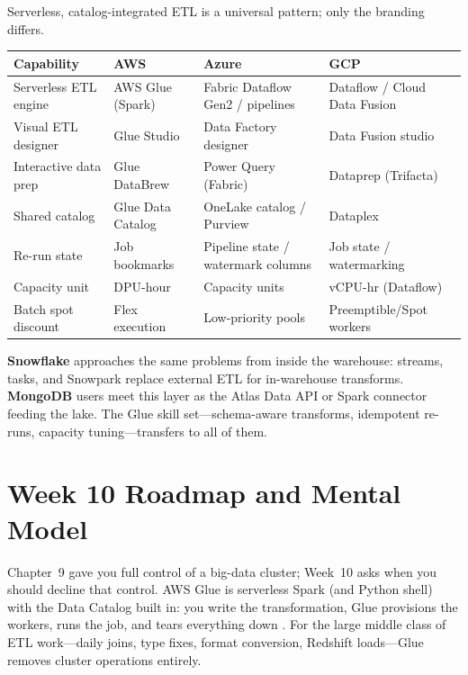 \begin{crosscloud}
Serverless, catalog-integrated ETL is a universal pattern; only the branding differs.

\vspace{2mm}
{\footnotesize
\begin{tabular}{@{}p{2.8cm}p{3.0cm}p{3.0cm}p{3.0cm}@{}}
\toprule
\textbf{Capability} & \textbf{AWS} & \textbf{Azure} & \textbf{GCP} \\
\midrule
Serverless ETL engine & AWS Glue (Spark) & Fabric Dataflow Gen2 / pipelines & Dataflow / Cloud Data Fusion \\
Visual ETL designer & Glue Studio & Data Factory designer & Data Fusion studio \\
Interactive data prep & Glue DataBrew & Power Query (Fabric) & Dataprep (Trifacta) \\
Shared catalog & Glue Data Catalog & OneLake catalog / Purview & Dataplex \\
Re-run state & Job bookmarks & Pipeline state / watermark columns & Job state / watermarking \\
\addlinespace
Capacity unit & DPU-hour & Capacity units & vCPU-hr (Dataflow) \\
Batch spot discount & Flex execution & Low-priority pools & Preemptible/Spot workers \\
\bottomrule
\end{tabular}}

\vspace{1mm}
\textbf{Snowflake} approaches the same problems from inside the warehouse: streams, tasks, and Snowpark replace external ETL for in-warehouse transforms. \textbf{MongoDB} users meet this layer as the Atlas Data API or Spark connector feeding the lake. The Glue skill set---schema-aware transforms, idempotent re-runs, capacity tuning---transfers to all of them.
\end{crosscloud}

\section{Week 10 Roadmap and Mental Model}
Chapter~9 gave you full control of a big-data cluster; Week~10 asks when you should decline that control. AWS Glue is serverless Spark (and Python shell) with the Data Catalog built in: you write the transformation, Glue provisions the workers, runs the job, and tears everything down \cite{awsGlueDocs}. For the large middle class of ETL work---daily joins, type fixes, format conversion, Redshift loads---Glue removes cluster operations entirely.

